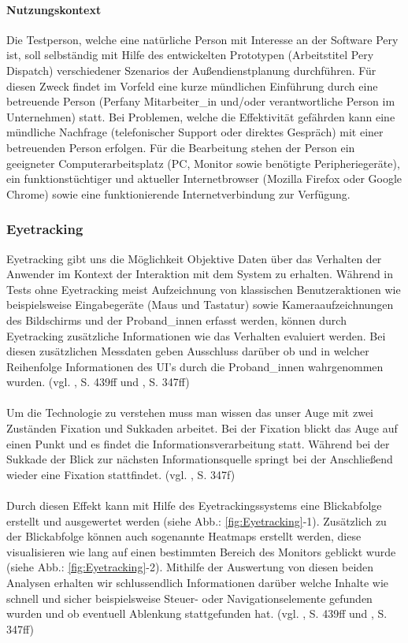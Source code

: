 \documentclass[Bachelorarbeit.tex]{subfiles}
\begin{document}
\paragraph{Nutzungskontext}
\label{Nutzungskontext}
Die Testperson, welche eine natürliche Person mit Interesse an der Software Pery ist, soll selbständig mit Hilfe des entwickelten Prototypen (Arbeitstitel Pery Dispatch) verschiedener Szenarios der   Außendienstplanung durchführen. 
Für diesen Zweck findet im Vorfeld eine kurze mündlichen Einführung durch eine betreuende Person (Perfany Mitarbeiter\_in und/oder verantwortliche Person im Unternehmen) statt.
Bei Problemen, welche die Effektivität gefährden kann eine mündliche Nachfrage (telefonischer Support oder direktes Gespräch) mit einer betreuenden Person erfolgen. 
Für die Bearbeitung stehen der Person ein geeigneter Computerarbeitsplatz (PC, Monitor sowie benötigte Peripheriegeräte), ein funktionstüchtiger und aktueller Internetbrowser (Mozilla Firefox oder Google Chrome) sowie eine funktionierende Internetverbindung zur Verfügung.


\subsubsection{Eyetracking}
\label{Eyetracking}

Eyetracking gibt uns die Möglichkeit Objektive Daten über das Verhalten der Anwender im Kontext der Interaktion mit dem System zu erhalten.
Während in Tests ohne Eyetracking meist Aufzeichnung von klassischen Benutzeraktionen wie beispielsweise Eingabegeräte (Maus und Tastatur) sowie Kameraaufzeichnungen des Bildschirms und der Proband\_innen erfasst werden, können durch Eyetracking zusätzliche Informationen wie das Verhalten evaluiert werden.
Bei diesen zusätzlichen Messdaten geben Ausschluss darüber ob und in welcher Reihenfolge Informationen des \ac{UI}'s durch die Proband\_innen wahrgenommen wurden. (vgl. \cite{Niegemann2008}, S. 439ff und \cite{Burmester}, S. 347ff)\\
\\
Um die Technologie zu verstehen muss man wissen das unser Auge mit zwei Zuständen Fixation und Sukkaden arbeitet.
Bei der Fixation blickt das Auge auf einen Punkt und es findet die Informationsverarbeitung statt. 
Während bei der Sukkade der Blick zur nächsten Informationsquelle springt bei der Anschließend wieder eine Fixation stattfindet. (vgl. \cite{Burmester}, S. 347f)\\
\\
Durch diesen Effekt kann mit Hilfe des Eyetrackingssystems eine Blickabfolge erstellt und ausgewertet werden (siehe Abb.: \ref{fig:Eyetracking}-1).
Zusätzlich zu der Blickabfolge können auch sogenannte Heatmaps erstellt werden, diese visualisieren wie lang auf einen bestimmten Bereich des Monitors geblickt wurde (siehe Abb.: \ref{fig:Eyetracking}-2).
Mithilfe der Auswertung von diesen beiden Analysen erhalten wir schlussendlich Informationen darüber welche Inhalte wie schnell und sicher beispielsweise Steuer- oder Navigationselemente gefunden wurden und ob eventuell Ablenkung stattgefunden hat. (vgl. \cite{Niegemann2008}, S. 439ff und \cite{Burmester}, S. 347ff)
\end{document}
